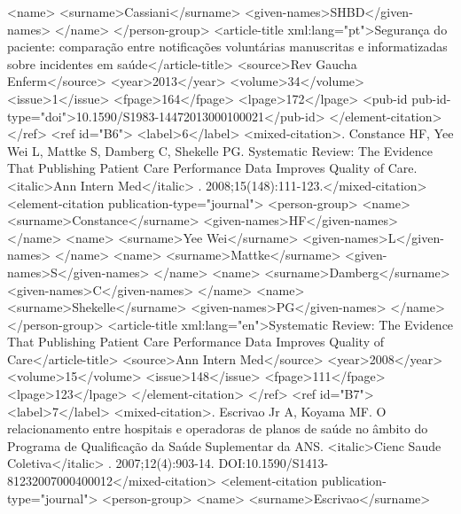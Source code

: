             <name>
              <surname>Cassiani</surname>
              <given-names>SHBD</given-names>
            </name>
          </person-group>
          <article-title xml:lang="pt">Segurança do paciente: comparação entre notificações
            voluntárias manuscritas e informatizadas sobre incidentes em saúde</article-title>
          <source>Rev Gaucha Enferm</source>
          <year>2013</year>
          <volume>34</volume>
          <issue>1</issue>
          <fpage>164</fpage>
          <lpage>172</lpage>
          <pub-id pub-id-type="doi">10.1590/S1983-14472013000100021</pub-id>
        </element-citation>
      </ref>
      <ref id="B6">
        <label>6</label>
        <mixed-citation>. Constance HF, Yee Wei L, Mattke S, Damberg C, Shekelle PG. Systematic
          Review: The Evidence That Publishing Patient Care Performance Data Improves Quality of
          Care. <italic>Ann Intern Med</italic> . 2008;15(148):111-123.</mixed-citation>
        <element-citation publication-type="journal">
          <person-group>
            <name>
              <surname>Constance</surname>
              <given-names>HF</given-names>
            </name>
            <name>
              <surname>Yee Wei</surname>
              <given-names>L</given-names>
            </name>
            <name>
              <surname>Mattke</surname>
              <given-names>S</given-names>
            </name>
            <name>
              <surname>Damberg</surname>
              <given-names>C</given-names>
            </name>
            <name>
              <surname>Shekelle</surname>
              <given-names>PG</given-names>
            </name>
          </person-group>
          <article-title xml:lang="en">Systematic Review: The Evidence That Publishing Patient Care
            Performance Data Improves Quality of Care</article-title>
          <source>Ann Intern Med</source>
          <year>2008</year>
          <volume>15</volume>
          <issue>148</issue>
          <fpage>111</fpage>
          <lpage>123</lpage>
        </element-citation>
      </ref>
      <ref id="B7">
        <label>7</label>
        <mixed-citation>. Escrivao Jr A, Koyama MF. O relacionamento entre hospitais e operadoras de
          planos de saúde no âmbito do Programa de Qualificação da Saúde Suplementar da ANS.
            <italic>Cienc Saude Coletiva</italic> . 2007;12(4):903-14.
          DOI:10.1590/S1413-81232007000400012</mixed-citation>
        <element-citation publication-type="journal">
          <person-group>
            <name>
              <surname>Escrivao</surname>
